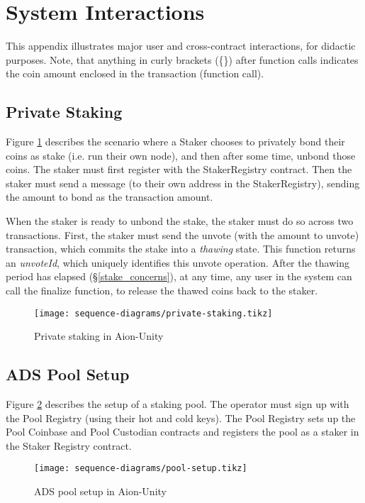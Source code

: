 \section{System Interactions}

This appendix illustrates major user and cross-contract interactions, for didactic purposes. Note, that anything in curly brackets (\{\}) after function calls indicates the coin amount enclosed in the transaction (function call).

\label{appendix:sequence_diagrams}

\subsection{Private Staking}
Figure \ref{fig:priv_staking} describes the scenario where a Staker chooses to privately bond their coins as stake (i.e. run their own node), and then after some time, unbond those coins. The staker must first register with the StakerRegistry contract. Then the staker must send a  message (to their own address in the StakerRegistry), sending the amount to bond as the transaction amount. 

When the staker is ready to unbond the stake, the staker must do so across two transactions. First, the staker must send the unvote (with the amount to unvote) transaction, which commits the stake into a \textit{thawing} state. This function returns an \textit{unvoteId}, which uniquely identifies this unvote operation. After the thawing period has elapsed (\S\ref{stake_concerns}), at any time, any user in the system can call the finalize function, to release the thawed coins back to the staker. 

\begin{figure}[ht]
\centering
\texttt{[image: sequence-diagrams/private-staking.tikz]}
\caption{Private staking in Aion-Unity}
\label{fig:priv_staking}
\end{figure}
\clearpage

\subsection{ADS Pool Setup}
Figure \ref{fig:pool_setup} describes the setup of a staking pool. The operator must sign up with the Pool Registry (using their hot and cold keys). The Pool Registry sets up the Pool Coinbase and Pool Custodian contracts and registers the pool as a staker in the Staker Registry contract. 

\begin{figure}[ht]
\centering
\texttt{[image: sequence-diagrams/pool-setup.tikz]}
\caption{ADS pool setup in Aion-Unity}
\label{fig:pool_setup}
\end{figure}
\clearpage

